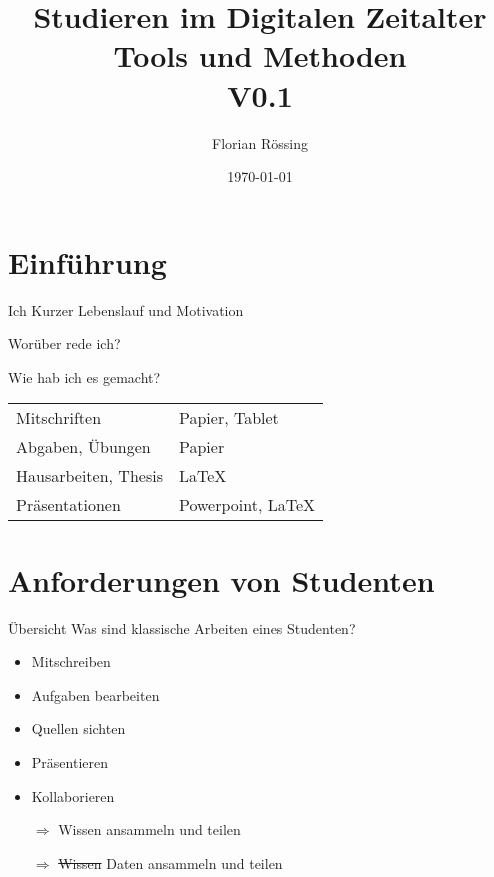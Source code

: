 \documentclass[aspectratio=169,shownotes]{beamer}
\title{Studieren im Digitalen Zeitalter \\\small Tools und Methoden\\ V0.1}
\author{Florian Rössing}
\date{\today}
\begin{document}
\maketitle

\section{Einführung}
\begin{frame}{Ich}
    Kurzer Lebenslauf und Motivation
\end{frame}

\begin{frame}{Worüber rede ich?}
\tableofcontents[sectionstyle=show,subsectionstyle=show/hide]
\end{frame}

\begin{frame}{Wie hab ich es gemacht?}
    \begin{tabularx}{\linewidth}{ll}
        Mitschriften & Papier, Tablet \\
        Abgaben, Übungen & Papier\\
        Hausarbeiten, Thesis & \LaTeX\\
        Präsentationen & Powerpoint, \LaTeX\\                
    \end{tabularx}
\end{frame}

\section{Anforderungen von Studenten}
\begin{frame}{Übersicht}
Was sind klassische Arbeiten eines Studenten?
    \begin{itemize}
        \item Mitschreiben
        \item Aufgaben bearbeiten
        \item Quellen sichten
        \item Präsentieren
        \item Kollaborieren     
        \item[$\Rightarrow$] Wissen ansammeln und teilen
        \item[$\Rightarrow$] \sout{Wissen} Daten ansammeln und teilen   
    \end{itemize}
\end{frame}
\end{document}
